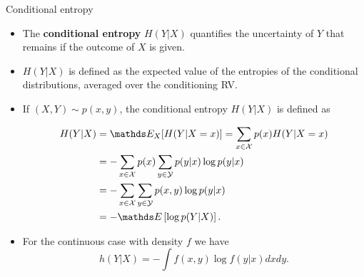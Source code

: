 \documentclass[11pt,compress,t,notes=noshow, xcolor=table]{beamer}
\begin{document}
\begin{vbframe}{Conditional entropy}
\begin{itemize}

\item The \textbf{conditional entropy} $H(Y|X)$ quantifies the uncertainty of $Y$ that remains if the outcome of $X$ is given.

\item $H(Y|X)$ is defined as the expected value of the entropies of the conditional distributions, averaged over the conditioning RV.
\item If $(X, Y) \sim p(x, y)$, the conditional entropy $H (Y|X)$ is defined as


\vspace{-0.2cm}
\footnotesize
\begin{equation*}\begin{aligned}
H(Y | X) &= \E_X[H(Y|X=x)] = \sum_{x \in \Xspace} p(x) H(Y | X=x) \\
&=-\sum_{x \in \Xspace} p(x) \sum_{y \in \Yspace} p(y | x) \log p(y | x) \\
&=-\sum_{x \in \Xspace} \sum_{y \in \Yspace} p(x, y) \log p(y | x) \\
&=-\E \left[\log p(Y | X) \right]. 
\end{aligned}\end{equation*}
\normalsize

\item For the continuous case with density $f$ we have $$h(Y|X) = - \int f(x,y) \log f(y|x) dx dy.$$
\end{itemize}

\end{vbframe}
\end{document}
